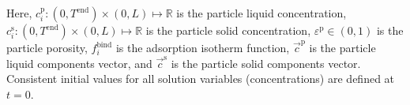 \documentclass{article}
\begin{document}
Here, $c^\mathrm{p}_i\colon  (0, T^\mathrm{end}) \times (0, L) \mapsto \mathbb{R}$ is the particle liquid concentration, $c^\mathrm{s}_i\colon  (0, T^\mathrm{end}) \times (0, L) \mapsto \mathbb{R}$ is the particle solid concentration, $\varepsilon^{\mathrm{p}}\in (0, 1)$ is the particle porosity, $f^\mathrm{bind}_i$ is the adsorption isotherm function, $\vec{c}^\mathrm{p}$ is the particle liquid components vector, and $\vec{c}^\mathrm{s}$ is the particle solid components vector.
Consistent initial values for all solution variables (concentrations) are defined at $t = 0$.
\end{document}
